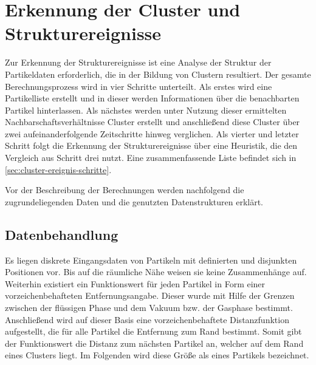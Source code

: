 




\chapter{Erkennung der Cluster und Strukturereignisse}\label{sec:cluster-ereignisse}

Zur Erkennung der Strukturereignisse ist eine Analyse der Struktur der Partikeldaten erforderlich, die in der Bildung von Clustern resultiert. Der gesamte Berechnungsprozess wird in vier Schritte unterteilt. Als erstes wird eine Partikelliste erstellt und in dieser werden Informationen über die benachbarten Partikel hinterlassen. Als nächstes werden unter Nutzung dieser ermittelten Nachbarschaftsverhältnisse Cluster erstellt und anschließend diese Cluster über zwei aufeinanderfolgende Zeitschritte hinweg verglichen. Als vierter und letzter Schritt folgt die Erkennung der Strukturereignisse über eine Heuristik, die den Vergleich aus Schritt drei nutzt. Eine zusammenfassende Liste befindet sich in \autoref{sec:cluster-ereignis-schritte}.

Vor der Beschreibung der Berechnungen werden nachfolgend die zugrundeliegenden Daten und die genutzten Datenstrukturen erklärt.

\section{Datenbehandlung}\label{sec:datenbehandlung}


Es liegen diskrete Eingangsdaten von Partikeln mit definierten und disjunkten Positionen vor. Bis auf die räumliche Nähe weisen sie keine Zusammenhänge auf. Weiterhin existiert ein Funktionswert für jeden Partikel in Form einer vorzeichenbehafteten Entfernungsangabe. Dieser wurde mit Hilfe der Grenzen zwischen der flüssigen Phase und dem Vakuum bzw. der Gasphase bestimmt. Anschließend wird auf dieser Basis eine vorzeichenbehaftete Distanzfunktion aufgestellt, die für alle Partikel die Entfernung zum Rand bestimmt. Somit gibt der Funktionswert die Distanz zum nächsten Partikel an, welcher auf dem Rand eines Clusters liegt. Im Folgenden wird diese Größe als  eines Partikels bezeichnet.

